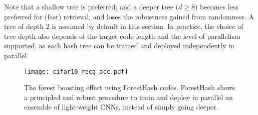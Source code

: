\documentclass[runningheads]{llncs}
\begin{document}
Note that a shallow tree is preferred; and a deeper tree ($d \ge 8$) becomes
less preferred for (fast) retrieval, and loses the robustness gained from
randomness. A tree of depth 2 is assumed by default in this section.  In
practice, the choice of tree depth also depends of the target code length and
the level of parallelism supported, as each hash tree can be trained and
deployed independently in parallel.


\begin{table*}[ht]
  \caption{Mean average precision (mAP  in \%) in percent of Hamming ranking  on MNIST.
  }
  \label{tab:mnist_map}
\end{table*}


\begin{figure}[t]
  \centering
  \texttt{[image: cifar10\_recg\_acc.pdf]}
  \caption{The forest boosting effect using ForestHash codes.  ForestHash shows
    a principled and robust procedure to train and deploy in parallel an
    ensemble of light-weight CNNs, instead of simply going deeper. }
  \label{fig:forestboost}
\end{figure}


\begin{table*}[ht]
  \caption{Cross-modality image retrieval using text queries on the Wiki dataset
    (mAP in \%).}
  \label{tab:wiki}
\end{table*}
\end{document}
